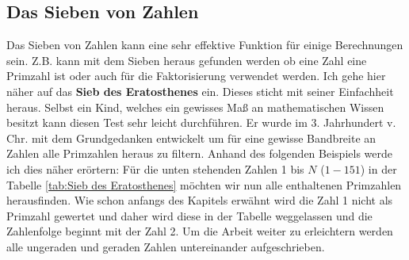 \documentclass[12pt,a4paper]{article}
\theoremstyle{definition}
\begin{document}
\subsection{Das Sieben von Zahlen}\label{Das Sieben von Zahlen}
Das Sieben von Zahlen kann eine sehr effektive Funktion für einige Berechnungen sein.
Z.B. kann mit dem Sieben heraus gefunden werden ob eine Zahl eine Primzahl ist oder auch für die Faktorisierung verwendet werden.
Ich gehe hier näher auf das \textbf{Sieb des Eratosthenes} ein.
Dieses sticht mit seiner Einfachheit heraus.
Selbst ein Kind, welches ein gewisses Maß an mathematischen Wissen besitzt kann diesen Test sehr leicht durchführen.
Er wurde im 3. Jahrhundert v. Chr. mit dem Grundgedanken entwickelt um für eine gewisse Bandbreite an Zahlen alle Primzahlen heraus zu filtern.
Anhand des folgenden Beispiels werde ich dies näher erörtern:\newline
Für die unten stehenden Zahlen 1 bis $N$ ($1-151$) in der Tabelle \ref{tab:Sieb des Eratosthenes} möchten wir nun alle enthaltenen Primzahlen herausfinden.
Wie schon anfangs des Kapitels erwähnt wird die Zahl 1 nicht als Primzahl gewertet und daher wird diese in der Tabelle weggelassen und die Zahlenfolge beginnt mit der Zahl 2.
Um die Arbeit weiter zu erleichtern werden alle ungeraden und geraden Zahlen untereinander aufgeschrieben.
\end{document}
